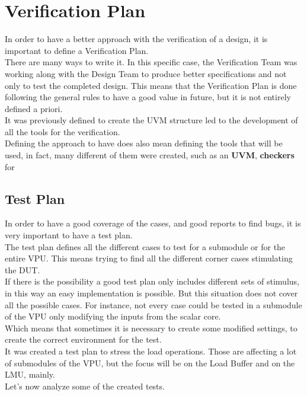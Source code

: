 \section{Verification Plan}
In order to have a better approach with the verification of a design, it is important to define a Verification Plan.\\
There are many ways to write it. In this specific case, the Verification Team was working along with the Design Team to produce better specifications and not only to test the completed design. This means that the Verification Plan is done following the general rules to have a good value in future, but it is not entirely defined a priori.\\

It was previously defined to create the UVM structure led to the development of all the tools for the verification. \\
Defining the approach to have does also mean defining the tools that will be used, in fact, many different of them were created, such as an \textbf{UVM}, \textbf{checkers} for 



\subsection{Test Plan}
In order to have a good coverage of the cases, and good reports to find bugs, it is very important to have a test plan.\\

The test plan defines all the different cases to test for a submodule or for the entire VPU. This means trying to find all the different corner cases stimulating the DUT.\\

If there is the possibility a good test plan only includes different sets of stimulus, in this way an easy implementation is possible. But this situation does not cover all the possible cases. For instance, not every case could be tested in a submodule of the VPU only modifying the inputs from the scalar core.\\
Which means that sometimes it is necessary to create some modified settings, to create the correct environment for the test.\\

It was created a test plan to stress the load operations. Those are affecting a lot of submodules of the VPU, but the focus will be on the Load Buffer and on the LMU, mainly.\\
Let's now analyze some of the created tests.

